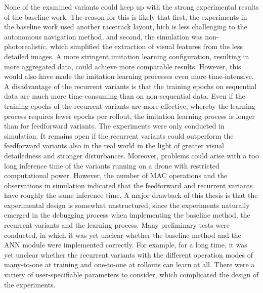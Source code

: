 None of the examined variants could keep up with the strong experimental results of the baseline work. 
The reason for this is likely that first, the experiments in the baseline work used another racetrack layout, 
hich is less challenging to the autonomous navigation method, and second, the simulation was non-photorealistic, 
which simplified the extraction of visual features from the less detailed images. 
A more stringent imitation learning configuration, resulting in more aggregated data, could achieve more 
comparable results. However, this would also have made the imitation learning processes even more time-intensive. 
A disadvantage of the recurrent variants is that the training epochs on sequential data are much more time-consuming 
than on non-sequential data. Even if the training epochs of the recurrent variants are more effective, 
whereby the learning process requires fewer epochs per rollout, the imitation learning process is longer than for 
feedforward variants. The experiments were only conducted in simulation. 
It remains open if the recurrent variants could outperform the feedforward variants also in the real world in the 
light of greater visual detailedness and stronger disturbances. 
Moreover, problems could arise with a too long inference time of the variants running on a drone with 
restricted computational power. However, the number of MAC operations and the observations in simulation 
indicated that the feedforward and recurrent variants have roughly the same inference time. 
A major drawback of this thesis is that the experimental design is somewhat unstructured, since the experiments 
naturally emerged in the debugging process when implementing the baseline method, the recurrent 
variants and the learning process. Many preliminary tests were conducted, in which it was yet unclear whether 
the baseline method and the ANN module were implemented correctly. For example, for a long time, it was yet 
unclear whether the recurrent variants with the different operation modes of many-to-one at training and 
one-to-one at rollouts can learn at all. There were a variety of user-specifiable parameters to consider, 
which complicated the design of the experiments.





